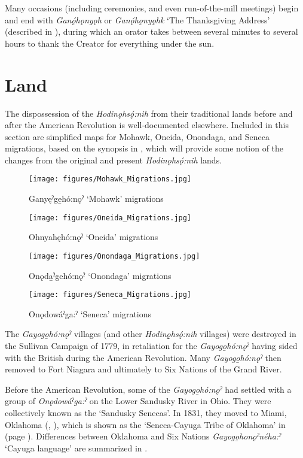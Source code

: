 Many occasions (including ceremonies, and even run-of-the-mill meetings) begin and end with \textit{Ganǫ́hǫnyǫh} or\textit{ Ganǫ́hǫnyǫhk} ‘The Thanksgiving Address’ (described in \cite{foster_earth_1974}), during which an orator takes between several minutes to several hours to thank the Creator for everything under the sun.


\section{Land}
\label{land}
The dispossession of the \textit{Hodinǫhsǫ́:nih} from their traditional lands before and after the American Revolution is well-documented elsewhere. Included in this section are simplified maps for Mohawk, Oneida, Onondaga, and Seneca migrations, based on the synopsis in \citet[3--6]{michelson_comparative_1988}, which will provide some notion of the changes from the original and present \textit{Hodinǫ̱hsǫ́:nih} lands. 

\begin{figure}
\texttt{[image: figures/Mohawk\_Migrations.jpg]}
\caption{Ganyęˀge̱hó:nǫˀ ‘Mohawk’ migrations}
\label{map:Mohawk.migrations}
\end{figure}


\begin{figure}
\texttt{[image: figures/Oneida\_Migrations.jpg]}
\caption{Ohnyahęhó:nǫˀ ‘Oneida’ migrations}
\label{map:Oneida.migrations}
\end{figure}

\begin{figure}
\texttt{[image: figures/Onondaga\_Migrations.jpg]}
\caption{Onǫda̱ˀgehó:nǫˀ ‘Onondaga’ migrations}
\label{map:Onondaga.migrations}
\end{figure}

\begin{figure}
\texttt{[image: figures/Seneca\_Migrations.jpg]}
\caption{Onǫdowáˀga:ˀ ‘Seneca’ migrations}
\label{map:Seneca.migrations}
\end{figure}

The \textit{Gayogo̱hó:nǫˀ} villages (and other \textit{Hodinǫ̱hsǫ́:nih} villages) were destroyed in the Sullivan Campaign of 1779, in retaliation for the \textit{Gayogo̱hó:nǫˀ} having sided with the British during the American Revolution. Many \textit{Gayogo̱hó:nǫˀ} then removed to Fort Niagara and ultimately to Six Nations of the Grand River. 

Before the American Revolution, some of the \textit{Gayogo̱hó:nǫˀ} had settled with a group of \textit{Onǫdowáˀga:ˀ} on the Lower Sandusky River in Ohio. They were collectively known as the ‘Sandusky Senecas’. In 1831, they moved to Miami, Oklahoma (\cite[5]{michelson_comparative_1988}, \cite[149]{mithun_iroquoian_1979}), which is shown as the ‘Seneca-Cayuga Tribe of Oklahoma’ in  (page \pageref{map:Cayuga.migrations}). Differences between Oklahoma and Six Nations \textit{Gayogo̱honǫˀnéha:ˀ} ‘Cayuga language’ are summarized in .

